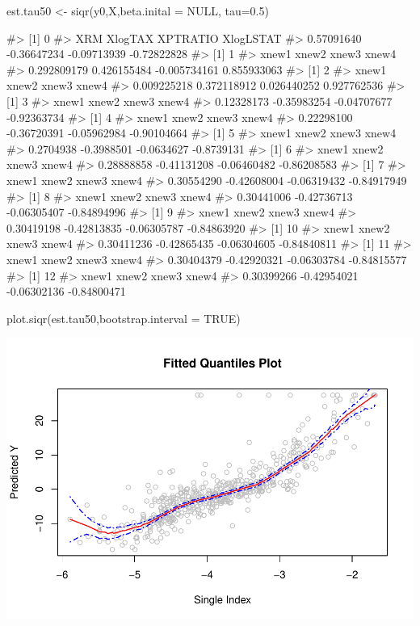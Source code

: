 \begin{Schunk}
\begin{Sinput}
est.tau50 <- siqr(y0,X,beta.inital = NULL, tau=0.5)
\end{Sinput}
\begin{Soutput}
#> [1] 0
#>         XRM     XlogTAX    XPTRATIO   XlogLSTAT 
#>  0.57091640 -0.36647234 -0.09713939 -0.72822828 
#> [1] 1
#>        xnew1        xnew2        xnew3        xnew4 
#>  0.292809179  0.426155484 -0.005734161  0.855933063 
#> [1] 2
#>       xnew1       xnew2       xnew3       xnew4 
#> 0.009225218 0.372118912 0.026440252 0.927762536 
#> [1] 3
#>       xnew1       xnew2       xnew3       xnew4 
#>  0.12328173 -0.35983254 -0.04707677 -0.92363734 
#> [1] 4
#>       xnew1       xnew2       xnew3       xnew4 
#>  0.22298100 -0.36720391 -0.05962984 -0.90104664 
#> [1] 5
#>      xnew1      xnew2      xnew3      xnew4 
#>  0.2704938 -0.3988501 -0.0634627 -0.8739131 
#> [1] 6
#>       xnew1       xnew2       xnew3       xnew4 
#>  0.28888858 -0.41131208 -0.06460482 -0.86208583 
#> [1] 7
#>       xnew1       xnew2       xnew3       xnew4 
#>  0.30554290 -0.42608004 -0.06319432 -0.84917949 
#> [1] 8
#>       xnew1       xnew2       xnew3       xnew4 
#>  0.30441006 -0.42736713 -0.06305407 -0.84894996 
#> [1] 9
#>       xnew1       xnew2       xnew3       xnew4 
#>  0.30419198 -0.42813835 -0.06305787 -0.84863920 
#> [1] 10
#>       xnew1       xnew2       xnew3       xnew4 
#>  0.30411236 -0.42865435 -0.06304605 -0.84840811 
#> [1] 11
#>       xnew1       xnew2       xnew3       xnew4 
#>  0.30404379 -0.42920321 -0.06303784 -0.84815577 
#> [1] 12
#>       xnew1       xnew2       xnew3       xnew4 
#>  0.30399266 -0.42954021 -0.06302136 -0.84800471
\end{Soutput}
\begin{Sinput}
plot.siqr(est.tau50,bootstrap.interval = TRUE)
\end{Sinput}

\includegraphics{siqr_files/figure-latex/unnamed-chunk-3-1} \end{Schunk}

